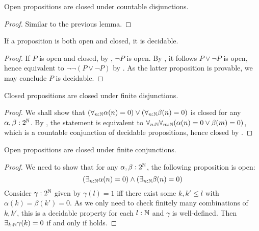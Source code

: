 \begin{lemma}\label{OpenCountableDisjunction}
  Open propositions are closed under countable disjunctions. 
\end{lemma}
\begin{proof}
  Similar to the previous lemma. 
\end{proof}

\begin{corollary}\label{ClopenDecidable}
  If a proposition is both open and closed, it is decidable. 
\end{corollary}
\begin{proof}
  If $P$ is open and closed, by , $\neg P$ is open.
  By , it follows $P\vee \neg P$ is open, 
  hence 
  equivalent to $\neg \neg (P \vee \neg P)$ by .
  As the latter proposition is provable, we may conclude $P$ is decidable. 
%  
\end{proof}

\begin{lemma}\label{ClosedFiniteDisjunction} 
  Closed propositions are closed under finite disjunctions. 
\end{lemma}
\begin{proof}
  We shall show that 
  $(\forall_{n:\mathbb{N}} \alpha(n) = 0 )\vee (\forall_{n:\mathbb{N}} \beta(n) = 0 )$ is closed for any $\alpha,\beta:2^{\mathbb{N}}$.
  By , the statement is equivalent to 
  $ \forall_{n:\mathbb{N}}  \forall_{m:\mathbb{N}}  (\alpha(n) = 0 \vee \beta(m) = 0)$, 
  which is a countable conjunction of decidable propositions, 
  hence closed by .
\end{proof}
\begin{lemma}\label{OpenFiniteConjunction}
  Open propositions are closed under finite conjunctions. 
\end{lemma}
\begin{proof}
  We need to show that for any $\alpha,\beta:2^{\mathbb{N}}$, the following proposition is open:
  \begin{equation}\label{eqnConjunctionOpen}
    (\exists_{n:\mathbb{N}} \alpha(n) = 0 )\wedge(\exists_{n:\mathbb{N}} \beta(n) = 0 )
  \end{equation}
  Consider $\gamma:2^{\mathbb{N}}$ given by 
  $\gamma(l) = 1$ iff there exist some $k,k'\leq l$ with 
  $\alpha(k) = \beta(k') = 0$. 
  As we only need to check finitely many combinations 
  of $k,k'$, this is a decidable property for each $l:\mathbb{N}$ and $\gamma$ is well-defined. 
  Then $\exists_{k:\mathbb{N}}\gamma(k)=0$ if and only if  holds.
\end{proof}

